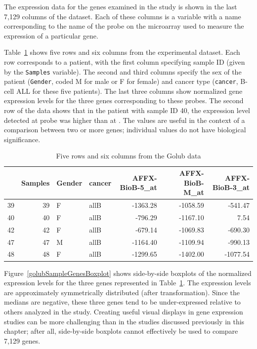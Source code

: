 The expression data for the genes examined in the study is shown in the last 7,129 columns of the dataset. Each of these columns is a variable with a name corresponding to the name of the probe on the microarray used to measure the expression of a particular gene. 


Table~\ref{sampleGolubData} shows five rows and six columns from the experimental dataset. Each row corresponds to a patient, with the first column specifying sample ID (given by the \texttt{Samples} variable). The second and third columns specify the sex of the patient (\texttt{Gender}, coded M for male or F for female) and cancer type (\texttt{cancer}, B-cell ALL for these five patients). The last three columns show normalized gene expression levels for the three genes corresponding to these probes. The second row of the data shows that in the patient with sample ID 40, the expression level detected at probe  was higher than at . The values are useful in the context of a comparison between two or more genes; individual values do not have biological significance. 
 
 \begin{table}[ht]
 \centering
 \begin{tabular}{rrllrrr}
   \hline
  & Samples & Gender & cancer & AFFX-BioB-5\_at & AFFX-BioB-M\_at & AFFX-BioB-3\_at \\ 
   \hline
 39 &  39 & F & allB & -1363.28 & -1058.59 & -541.47 \\ 
   40 &  40 & F & allB & -796.29 & -1167.10 & 7.54 \\ 
   42 &  42 & F & allB & -679.14 & -1069.83 & -690.30 \\ 
   47 &  47 & M & allB & -1164.40 & -1109.94 & -990.13 \\ 
   48 &  48 & F & allB & -1299.65 & -1402.00 & -1077.54 \\  
    \hline
 \end{tabular}
 \caption{Five rows and six columns from the Golub data} 
 \label{sampleGolubData}
 \end{table}

Figure~\ref{golubSampleGenesBoxplot} shows side-by-side boxplots of the normalized expression levels for the three genes represented in Table~\ref{sampleGolubData}. The expression levels are approximately symmetrically distributed (after transformation). Since the medians are negative, these three genes tend to be under-expressed relative to others analyzed in the study. Creating useful visual displays in gene expression studies can be more challenging than in the studies discussed previously in this chapter; after all, side-by-side boxplots cannot effectively be used to compare 7,129 genes. 

